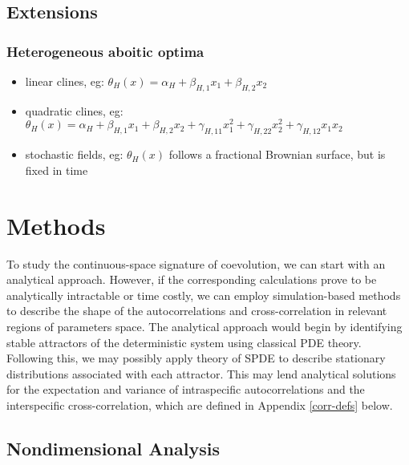 \documentclass{article}
\begin{document}
\hypertarget{extensions}{%
\subsection{Extensions}\label{extensions}}

\hypertarget{heterogeneous-aboitic-optima}{%
\subsubsection{Heterogeneous aboitic
optima}\label{heterogeneous-aboitic-optima}}

\begin{itemize}
\tightlist
\item
  linear clines, eg:
  \(\theta_H(x)=\alpha_H+\beta_{H,1}x_1+\beta_{H,2}x_2\)
\item
  quadratic clines, eg:
  \(\theta_H(x)=\alpha_H+\beta_{H,1}x_1+\beta_{H,2}x_2+\gamma_{H,11}x_1^2+\gamma_{H,22}x_2^2+\gamma_{H,12}x_1x_2\)
\item
  stochastic fields, eg: \(\theta_H(x)\) follows a fractional Brownian
  surface, but is fixed in time
\end{itemize}

\hypertarget{methods}{%
\section{Methods}\label{methods}}

To study the continuous-space signature of coevolution, we can start
with an analytical approach. However, if the corresponding calculations
prove to be analytically intractable or time costly, we can employ
simulation-based methods to describe the shape of the autocorrelations
and cross-correlation in relevant regions of parameters space. The
analytical approach would begin by identifying stable attractors of the
deterministic system using classical PDE theory. Following this, we may
possibly apply theory of SPDE to describe stationary distributions
associated with each attractor. This may lend analytical solutions for
the expectation and variance of intraspecific autocorrelations and the
interspecific cross-correlation, which are defined in Appendix
\ref{corr-defs} below.

\hypertarget{nondimensional-analysis}{%
\subsection{Nondimensional Analysis}\label{nondimensional-analysis}}
\end{document}
